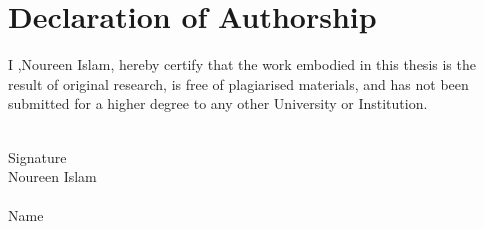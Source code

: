 \chapter*{Declaration of Authorship}

I ,Noureen Islam, hereby certify that the work embodied in this thesis is the result of original research, is free of plagiarised materials, and has not been submitted for a higher degree to any other University or Institution.

\vspace{5cm}
\noindent
\makebox[2.5in]{\hrulefill}\\
Signature \\[4ex]

Noureen Islam\\
\makebox[2.5in]{\hrulefill}\\
Name\\
